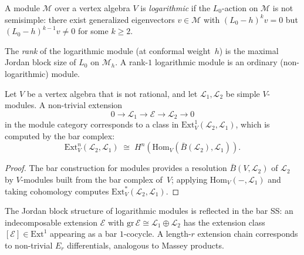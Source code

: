 \begin{definition}
\label{def:logarithmic-module}
A module $\mathcal{M}$ over a vertex algebra $V$ is
\emph{logarithmic} if the $L_0$-action on $\mathcal{M}$ is not
semisimple: there exist generalized eigenvectors
$v \in \mathcal{M}$ with $(L_0 - h)^k v = 0$ but
$(L_0 - h)^{k-1} v \neq 0$ for some $k \geq 2$.

The \emph{rank} of the logarithmic module (at conformal
weight~$h$) is the maximal Jordan block size of $L_0$ on
$\mathcal{M}_h$.  A rank-$1$ logarithmic module is an ordinary
(non-logarithmic) module.
\end{definition}

\begin{proposition}
\label{prop:logarithmic-bar}
Let $V$ be a vertex algebra that is not rational, and let
$\mathcal{L}_1, \mathcal{L}_2$ be simple $V$-modules.  A
non-trivial extension
\begin{equation}\label{eq:log-extension}
0 \to \mathcal{L}_1 \to \mathcal{E} \to \mathcal{L}_2 \to 0
\end{equation}
in the module category corresponds to a class in
$\mathrm{Ext}^1_V(\mathcal{L}_2, \mathcal{L}_1)$, which is
computed by the bar complex:
\begin{equation}\label{eq:ext-bar}
\mathrm{Ext}^n_V(\mathcal{L}_2, \mathcal{L}_1)
\;\cong\; H^n(\mathrm{Hom}_V(\bar{B}(\mathcal{L}_2),
\mathcal{L}_1)).
\end{equation}
\end{proposition}

\begin{proof}
The bar construction for modules provides a resolution
$\bar{B}(V, \mathcal{L}_2)$ of $\mathcal{L}_2$ by
$V$-modules built from the bar complex of~$V$; applying
$\mathrm{Hom}_V(-, \mathcal{L}_1)$ and taking cohomology
computes $\mathrm{Ext}^*_V(\mathcal{L}_2, \mathcal{L}_1)$.
\end{proof}

\begin{remark}
\label{rem:jordan-bar-spectral}
The Jordan block structure of logarithmic modules is reflected in the bar SS: an indecomposable extension $\mathcal{E}$ with $\mathrm{gr}\,\mathcal{E} \cong \mathcal{L}_1 \oplus \mathcal{L}_2$ has the extension class $[\mathcal{E}] \in \mathrm{Ext}^1$ appearing as a bar $1$-cocycle.  A length-$r$ extension chain corresponds to non-trivial $E_r$ differentials, analogous to Massey products.
\end{remark}

